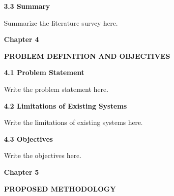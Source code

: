 \documentclass[12pt]{article}
\begin{document}
\vspace{0.5cm}

\noindent
\textbf{3.3 Summary}

\vspace{0.25cm}

Summarize the literature survey here.

\newpage

\begin{center}
\textbf{\Large Chapter 4}
\end{center}

\vspace{0.4cm}

\begin{center}
\textbf{\Large PROBLEM DEFINITION AND OBJECTIVES}
\end{center}

\vspace{0.6cm}

\noindent
\textbf{4.1 Problem Statement}

\vspace{0.25cm}

Write the problem statement here.

\vspace{0.5cm}

\noindent
\textbf{4.2 Limitations of Existing Systems}

\vspace{0.25cm}

Write the limitations of existing systems here.

\vspace{0.5cm}

\noindent
\textbf{4.3 Objectives}

\vspace{0.25cm}

Write the objectives here.

\newpage

\begin{center}
\textbf{\Large Chapter 5}
\end{center}

\vspace{0.4cm}

\begin{center}
\textbf{\Large PROPOSED METHODOLOGY}
\end{center}
\end{document}
